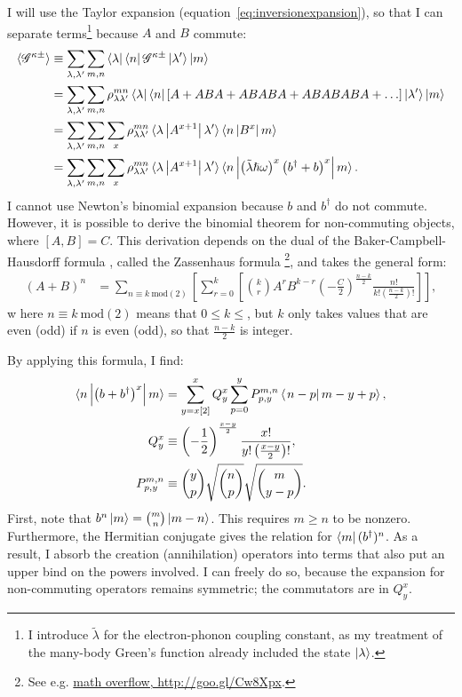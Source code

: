 I will use the Taylor expansion (equation~\ref{eq:inversionexpansion}), so that I can separate terms\footnote{I introduce $\tilde{\lambda}$ for the electron-phonon coupling constant, as my treatment of the many-body Green's function already included the state $\ket{\lambda}$.} because $A$ and $B$ commute:
\begin{align*}
\braket{\mathscr{G}^{\kappa\pm}} &\equiv \sum_{\lambda, \lambda^\prime} \sum_{m,n} \bra{\lambda}\bra{n} \mathscr{G}^{\kappa\pm} \ket{\lambda^\prime}\ket{m} \\
&= \sum_{\lambda, \lambda^\prime} \sum_{m,n}\rho_{\lambda\lambda^\prime}^{mn} \bra{\lambda}\bra{n}\left[A + ABA + ABABA + ABABABA + \ldots\right] \ket{\lambda^\prime}\ket{m} \\
&= \sum_{\lambda, \lambda^\prime} \sum_{m,n} \sum_x\rho_{\lambda\lambda^\prime}^{mn} \braket{\lambda \left| A^{x+1} \right| \lambda^\prime} \braket{n\left| B^x \right|m} \\
&= \sum_{\lambda, \lambda^\prime} \sum_{m,n} \sum_x\rho_{\lambda\lambda^\prime}^{mn} \braket{\lambda \left| A^{x+1} \right| \lambda^\prime} \braket{n\left| \left(\tilde{\lambda}\hslash\omega\right)^x\left(b^\dagger+b\right)^x \right|m}.
\end{align*}
I cannot use Newton's binomial expansion because $b$ and $b^\dagger$ do not commute. However, it is possible to derive the binomial theorem for non-commuting objects, where $\left[A,B\right] = C$. This derivation depends on the dual of the Baker-Campbell-Hausdorff formula \cite{kaspermothpoulsen}, called the Zassenhaus formula \footnote{See e.g. \href{http://goo.gl/Cw8Xpx}{math overflow, http://goo.gl/Cw8Xpx}.}, and takes the general form:
\begin{align*}
(A+B)^n &= \sum_{n\equiv k\:\text{mod}(2)}\left[ \sum^k_{r=0}\left[ \binom{k}{r}A^r B^{k-r} \left(-\frac{C}{2}\right)^\frac{n-k}{2} \frac{n!}{k! \left(\frac{n-k}{2}\right)!}\right]\right],
\end{align*} w
here $n\equiv k\:\text{mod}(2)$ means that $0\leq k\leq$, but $k$ only takes values that are even (odd) if $n$ is even (odd), so that $\frac{n-k}{2}$ is integer.

By applying this formula, I find:
\begin{align*}
\braket{n \left| \left(b+b^\dagger\right)^x \right| m}&= \sum_{y=x[2]}^x Q^x_y \sum_{p=0}^{y} P^{m,n}_{p,y} \braket{\left. n-p \right| m-y+p}, \\
Q^x_y&\equiv \left(-\frac{1}{2}\right)^{\frac{x-y}{2}} \frac{ x! }{ y! \left(\frac{x-y}{2}\right)!},\\
P_{p,y}^{m,n} &\equiv \binom{y}{p} \sqrt{ \binom{n}{p}} \sqrt{\binom{m}{y-p}}.
\end{align*}
First, note that $b^n \ket{m} = \binom{m}{n} \ket{m-n}$. This requires $m\geq n$ to be nonzero. Furthermore, the Hermitian conjugate gives the relation for $\bra{m} (b^\dagger)^n$. As a result, I absorb the creation (annihilation) operators into terms that also put an upper bind on the powers involved. I can freely do so, because the expansion for non-commuting operators remains symmetric; the commutators are in $Q^x_y$. 


